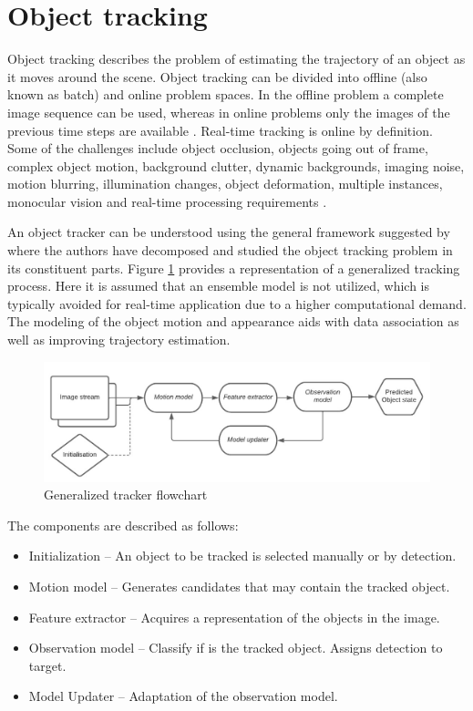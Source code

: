 \documentclass[a4paper,twoside,12pt]{report}
\begin{document}
\section{Object tracking}

Object tracking describes the problem of estimating the trajectory of an object as it moves around the scene. Object tracking can be divided into offline (also known as batch) and online problem spaces. In the offline problem a complete image sequence can be used, whereas in online problems only the images of the previous time steps are available  \citep{track0}. Real-time tracking is online by definition. Some of the challenges include object occlusion, objects going out of frame, complex object motion, background clutter, dynamic backgrounds, imaging noise, motion blurring, illumination changes, object deformation, multiple instances, monocular vision and real-time processing requirements \citep{tradtrack0}.

An object tracker can be understood using the general framework suggested by \cite{diagnosingtrack} where the authors have decomposed and studied the object tracking problem in its constituent parts. Figure \ref{fig:tracker} provides a representation of a generalized tracking process. Here it is assumed that an ensemble model is not utilized, which is typically avoided for real-time application due to a higher computational demand. The modeling of the object motion and appearance aids with data association as well as improving trajectory estimation. \citep{sort}  

\begin{figure}[h!]
\begin{center}
\includegraphics[width=13.5cm]{images/Tracking_flowchart.jpeg}
\caption{Generalized tracker flowchart}
\label{fig:tracker}
\end{center}
\end{figure}

\pagebreak
The components are described as follows:

\begin{itemize}
    \item Initialization -- An object to be tracked is selected manually or by detection.
    \item Motion model -- Generates candidates that may contain the tracked object.
    \item Feature extractor -- Acquires a representation of the objects in the image.
    \item Observation model -- Classify if is the tracked object. Assigns detection to target.
    \item Model Updater -- Adaptation of the observation model.
\end{itemize}
\end{document}
